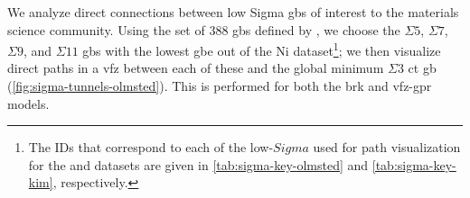 \documentclass[final,twocolumn,12pt]{elsarticle}
\begin{document}
	We analyze direct connections between low Sigma \glspl{gb} of interest to the materials science community. Using the set of 388 \glspl{gb} defined by \citet{olmstedSurveyComputedGrain2009}, we choose the $\Sigma5$, $\Sigma7$, $\Sigma9$, and $\Sigma11$ \glspl{gb} with the lowest \gls{gbe} out of the \citet{olmstedSurveyComputedGrain2009} Ni dataset\footnote{The IDs that correspond to each of the low-$Sigma$ used for path visualization for the \citet{olmstedSurveyComputedGrain2009} and \citet{kimPhasefieldModeling3D2014} datasets are given in \cref{tab:sigma-key-olmsted} and \cref{tab:sigma-key-kim}, respectively. }; we then visualize direct paths in a \gls{vfz} between each of these and the global minimum $\Sigma3$ \gls{ct} \gls{gb} (\cref{fig:sigma-tunnels-olmsted}). This is performed for both the \gls{brk} and \gls{vfz}-\gls{gpr} models.
	
		
\end{document}
